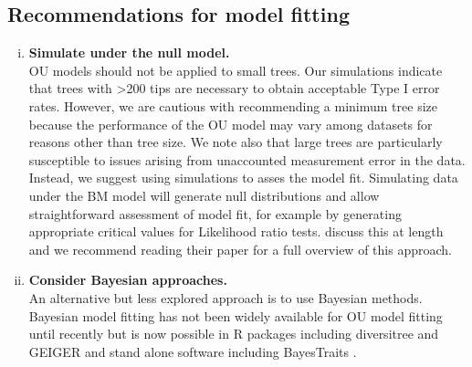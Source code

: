 \documentclass[a4paper,12pt]{article}
\begin{document}
  \subsection{Recommendations for model fitting}
    \begin{enumerate}[(i)]
      \item \textbf{Simulate under the null model.}\\
      OU models should not be applied to small trees. 
      Our simulations indicate that trees with \textgreater 200 tips are necessary to obtain acceptable Type I error rates. 
      However, we are cautious with recommending a minimum tree size because the performance of the OU model may vary among datasets for reasons other than tree size. 
      We note also that large trees are particularly susceptible to issues arising from unaccounted measurement error in the data. 
      Instead, we suggest using simulations to asses the model fit. Simulating data under the BM model will generate null distributions \citep[e.g.,][]{boettiger2012your} and allow straightforward assessment of model fit, for example by generating appropriate critical values for Likelihood ratio tests. %
      \citealp{boettiger2012your} discuss this at length and we recommend reading their paper for a full overview of this approach.
    
      \item \textbf{Consider Bayesian approaches.}\\
      An alternative but less explored approach is to use Bayesian methods. 
      Bayesian model fitting has not been widely available for OU model fitting until recently but is now possible in R packages including diversitree \citep{FitzJohn:2012aa} and GEIGER \citep[the Single Stationary Peak model in \texttt{fitContinuousMCMC};][]{Harmon:2008aa} and stand alone software including BayesTraits \citep{pagel2013bayestraits}.
	

\end{enumerate}
\end{document}

